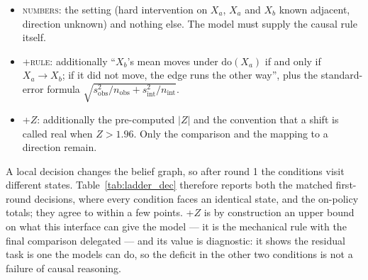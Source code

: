 \documentclass{article}
\begin{document}
\begin{itemize}
\item \textsc{numbers}: the setting (hard intervention on $X_a$, $X_a$ and $X_b$ known
adjacent, direction unknown) and nothing else. The model must supply the causal rule itself.
\item \textsc{+rule}: additionally ``$X_b$'s mean moves under $\mathrm{do}(X_a)$ if and only if
$X_a \to X_b$; if it did not move, the edge runs the other way'', plus the standard-error
formula $\sqrt{s^2_{\mathrm{obs}}/n_{\mathrm{obs}} + s^2_{\mathrm{int}}/n_{\mathrm{int}}}$.
\item \textsc{+$Z$}: additionally the pre-computed $|Z|$ and the convention that a shift is
called real when $Z > 1.96$. Only the comparison and the mapping to a direction remain.
\end{itemize}

A local decision changes the belief graph, so after round 1 the conditions visit different
states. Table~\ref{tab:ladder_dec} therefore reports both the matched first-round decisions,
where every condition faces an identical state, and the on-policy totals; they agree to within
a few points. \textsc{+$Z$} is by construction an upper bound on what this interface can give
the model --- it is the mechanical rule with the final comparison delegated --- and its value
is diagnostic: it shows the residual task is one the models can do, so the deficit in the other
two conditions is not a failure of causal reasoning.
\end{document}
